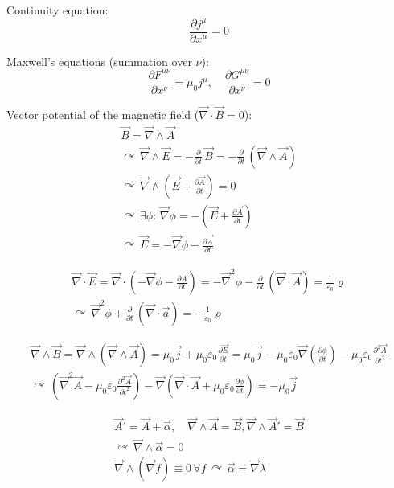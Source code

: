\documentclass[fontsize=11pt,a4paper]{scrartcl}
\begin{document}
Continuity equation:
\[
	\frac{\partial j^\mu}{\partial x^\mu}=0
\]

Maxwell's equations (summation over $\nu$):
\[
	\frac{\partial F^{\mu\nu}}{\partial x^\nu}=\mu_0 j^\mu,\quad\frac{\partial G^{\mu\nu}}{\partial x^\nu}=0
\]

Vector potential of the magnetic field ($\vec\nabla\cdot\vec B=0$):
\begin{gather*}
	\vec B=\vec\nabla\wedge\vec A\\
	\curvearrowright\,\vec\nabla\wedge\vec E=-\frac{\partial}{\partial t}\,\vec B=-\frac{\partial}{\partial t}\,\left(\vec\nabla\wedge\vec A\right)\\
	\curvearrowright\,\vec\nabla\wedge\left(\vec E+\frac{\partial\vec A}{\partial t}\right)=0\\
	\curvearrowright\,\exists\phi:\,\vec\nabla\phi=-\left(\vec E+\frac{\partial\vec A}{\partial t}\right)\\
	\curvearrowright\,\vec E=-\vec\nabla\phi-\frac{\partial\vec A}{\partial t}
\end{gather*}

\begin{gather*}
	\vec\nabla\cdot\vec E=\vec\nabla\cdot\left(-\vec\nabla\phi-\frac{\partial\vec A}{\partial t}\right)=-\vec\nabla^2\phi-\frac{\partial}{\partial t}\,\left(\vec\nabla\cdot\vec A\right)=\frac{1}{\varepsilon_0}\varrho\\
	\curvearrowright\,\vec\nabla^2\phi+\frac{\partial}{\partial t}\,\left(\vec\nabla\cdot\vec a\right)=-\frac{1}{\varepsilon_0}\varrho
\end{gather*}

\begin{gather*}
	\vec\nabla\wedge\vec B=\vec\nabla\wedge\left(\vec\nabla\wedge\vec A\right)=\mu_0\vec j+\mu_0\varepsilon_0\frac{\partial\vec E}{\partial t}=\mu_0\vec j-\mu_0\varepsilon_0\vec\nabla\left(\frac{\partial\phi}{\partial t}\right)-\mu_0\varepsilon_0\frac{\partial^2\vec A}{\partial t^2}\\
	\curvearrowright\,\left(\vec\nabla^2\vec A-\mu_0\varepsilon_0\frac{\partial^2\vec A}{\partial t^2}\right)-\vec\nabla\left(\vec\nabla\cdot\vec A+\mu_0\varepsilon_0\frac{\partial\phi}{\partial t}\right)=-\mu_0\vec j
\end{gather*}

\begin{gather*}
	\vec A'=\vec A+\vec\alpha,\quad\vec\nabla\wedge\vec A=\vec B,\vec\nabla\wedge\vec A'=\vec B\\
	\curvearrowright\,\vec\nabla\wedge\vec\alpha=0\\
	\vec\nabla\wedge(\vec\nabla f)\equiv 0\,\forall f\,\curvearrowright\,\vec\alpha=\vec\nabla\lambda
\end{gather*}
\end{document}
